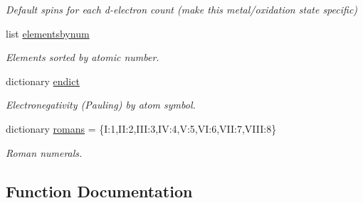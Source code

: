 \begin{DoxyCompactItemize}
\begin{DoxyCompactList}\small\item\em Default spins for each d-\/electron count (make this metal/oxidation state specific) \end{DoxyCompactList}\item 
list \hyperlink{namespacemolSimplify_1_1Classes_1_1globalvars_a257faf0e6e5695b5c8d0835360f7b054}{elementsbynum}
\begin{DoxyCompactList}\small\item\em Elements sorted by atomic number. \end{DoxyCompactList}\item 
dictionary \hyperlink{namespacemolSimplify_1_1Classes_1_1globalvars_a01f6eb6722ce46d78ee3004480cbd069}{endict}
\begin{DoxyCompactList}\small\item\em Electronegativity (Pauling) by atom symbol. \end{DoxyCompactList}\item 
dictionary \hyperlink{namespacemolSimplify_1_1Classes_1_1globalvars_a3548f27e4e3159bbb6d8ff08c0437a00}{romans} = \{\textquotesingle{}I\textquotesingle{}\+:\textquotesingle{}1\textquotesingle{},\textquotesingle{}II\textquotesingle{}\+:\textquotesingle{}2\textquotesingle{},\textquotesingle{}I\+II\textquotesingle{}\+:\textquotesingle{}3\textquotesingle{},\textquotesingle{}IV\textquotesingle{}\+:\textquotesingle{}4\textquotesingle{},\textquotesingle{}V\textquotesingle{}\+:\textquotesingle{}5\textquotesingle{},\textquotesingle{}VI\textquotesingle{}\+:\textquotesingle{}6\textquotesingle{},\textquotesingle{}V\+II\textquotesingle{}\+:\textquotesingle{}7\textquotesingle{},\textquotesingle{}V\+I\+II\textquotesingle{}\+:\textquotesingle{}8\textquotesingle{}\}
\begin{DoxyCompactList}\small\item\em Roman numerals. \end{DoxyCompactList}\end{DoxyCompactItemize}


\subsection{Function Documentation}
\mbox{\label{namespacemolSimplify_1_1Classes_1_1globalvars_a257ff4ceeae01b0f58def39acb903d95}} 
